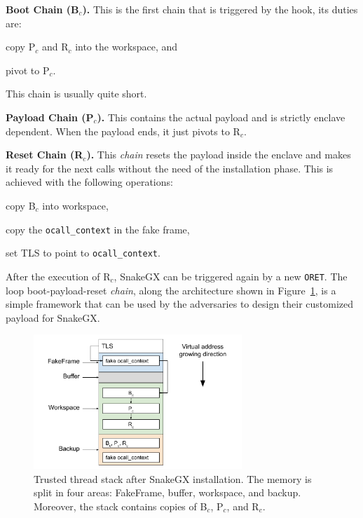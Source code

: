 \textbf{Boot Chain (B$_c$).} This is the first chain that is triggered by 
the hook, its duties are:
\begin{enumerate*}[label=(\roman*)]
	\item copy P$_c$ and R$_c$ into the workspace, and
	\item pivot to P$_c$.
\end{enumerate*} 
This chain is usually quite short.

\textbf{Payload Chain (P$_c$).} This contains the actual payload 
and is strictly enclave dependent. When the payload ends, it just pivots to 
R$_c$.

\textbf{Reset Chain (R$_c$).} 
This \emph{chain} resets the payload inside the enclave and makes it ready for 
the next calls without the need of the installation phase.
This is achieved with the following operations:
\begin{enumerate*}[label=(\roman*)]
	\item copy B$_c$ into workspace,
	\item copy the \texttt{ocall\_context} in the fake frame,
	\item set TLS to point to \texttt{ocall\_context}.
\end{enumerate*}

After the execution of R$_c$, SnakeGX can be triggered again by a new 
\texttt{ORET}.
The loop boot-payload-reset \emph{chain}, along the architecture shown in 
Figure~\ref{fig:t-thread-stack-installed}, is a simple framework that can be 
used by the adversaries to design their customized payload for SnakeGX.

\begin{figure}[t]
	\centering
	\includegraphics[width=0.7\textwidth]{fig_c5/t-thread-stack-installed.pdf}
	\caption[SnakeGX installation layour.]{Trusted thread stack after SnakeGX 
	installation. The memory is split in four areas: FakeFrame, buffer, 
	workspace, and backup. Moreover, the stack contains copies of B$_{c}$, 
	P$_{c}$, and R$_{c}$.}
	\label{fig:t-thread-stack-installed}
\end{figure}

